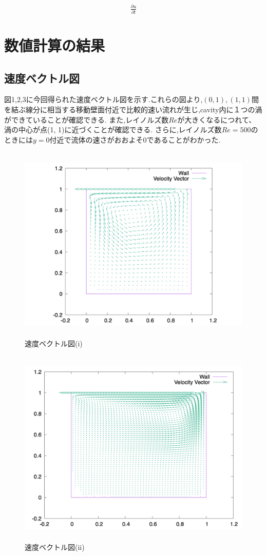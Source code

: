 \documentclass[upLaTeX,a4paper]{jsarticle}
\begin{document}
\begin{equation}
  \begin{split}
    \frac{\partial u}{\partial t}
  \end{split}
\end{equation}

\section{数値計算の結果}
\subsection{速度ベクトル図}
図1,2,3に今回得られた速度ベクトル図を示す.これらの図より,$(0,1),(1,1)$間を結ぶ線分に相当する移動壁面付近で比較的速い流れが生じ,cavity内に１つの渦ができていることが確認できる.
また,レイノルズ数$Re$が大きくなるにつれて、渦の中心が点(1, 1)に近づくことが確認できる.
さらに,レイノルズ数$Re=500$のときには$y=0$付近で流体の速さがおおよそ0であることがわかった.
\begin{figure}[H]
  \centering
  \includegraphics[height=9.5cm]{outputs/img/velocity_vector_re50.png}
  \caption{速度ベクトル図(i)}
  \label{fig:velocity_vector_re50}
\end{figure}
\begin{figure}[H]
  \centering
  \includegraphics[height=9.5cm]{outputs/img/velocity_vector_re200.png}
  \caption{速度ベクトル図(ii)}
  \label{fig:velocity_vector_re200}
\end{figure}
\end{document}
